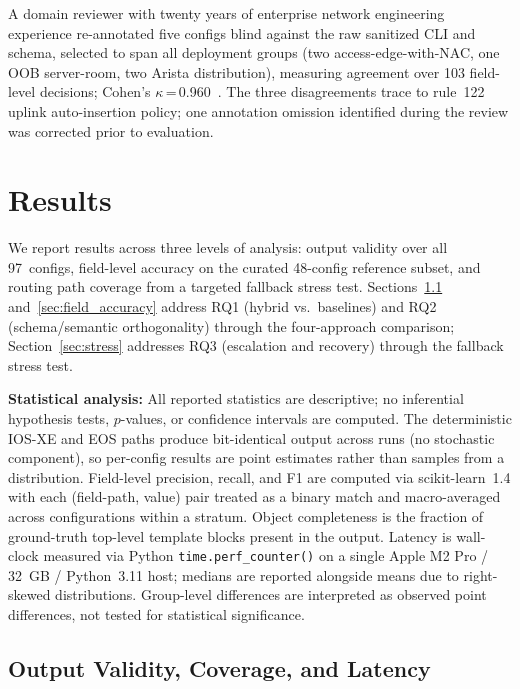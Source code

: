 \documentclass[conference]{IEEEtran}
\begin{document}
A domain reviewer with twenty years of enterprise network engineering experience re-annotated five configs blind against the raw sanitized CLI and schema, selected to span all deployment groups (two access-edge-with-NAC, one OOB server-room, two Arista distribution), measuring agreement over 103 field-level decisions; Cohen's $\kappa$\,=\,0.960~\cite{landis1977measurement}. The three disagreements trace to rule~122 uplink auto-insertion policy; one annotation omission identified during the review was corrected prior to evaluation.

\section{Results}
\label{sec:results}

We report results across three levels of analysis: output validity over all 97~configs, field-level accuracy on the curated 48-config reference subset, and routing path coverage from a targeted fallback stress test. Sections~\ref{sec:validity} and~\ref{sec:field_accuracy} address RQ1 (hybrid vs.~baselines) and RQ2 (schema/semantic orthogonality) through the four-approach comparison; Section~\ref{sec:stress} addresses RQ3 (escalation and recovery) through the fallback stress test.

\textbf{Statistical analysis:} All reported statistics are descriptive; no inferential hypothesis tests, $p$-values, or confidence intervals are computed. The deterministic IOS-XE and EOS paths produce bit-identical output across runs (no stochastic component), so per-config results are point estimates rather than samples from a distribution. Field-level precision, recall, and F1 are computed via scikit-learn~1.4 with each (field-path, value) pair treated as a binary match and macro-averaged across configurations within a stratum. Object completeness is the fraction of ground-truth top-level template blocks present in the output. Latency is wall-clock measured via Python \texttt{time.perf\_counter()} on a single Apple M2 Pro / 32~GB / Python~3.11 host; medians are reported alongside means due to right-skewed distributions. Group-level differences are interpreted as observed point differences, not tested for statistical significance.

\subsection{Output Validity, Coverage, and Latency}
\label{sec:validity}
\end{document}
